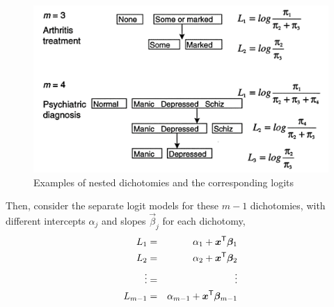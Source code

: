 \documentclass[11pt]{book}\usepackage[]{graphicx}\usepackage[]{color}
\begin{document}
\begin{figure}[htb]
  \centering
  \includegraphics[width=.8\textwidth]{ch07/fig/nested1c}
  \caption[Nested dichotomies]{Examples of nested dichotomies and the corresponding logits}\label{fig:nested1}
\end{figure}

Then, consider the separate logit models for these $m-1$ dichotomies, with different
intercepts $\alpha_j$ and slopes $\vec{\beta}_j$ for each dichotomy,
\begin{eqnarray*}
  L_1 & = & \alpha_1 + \bm{x} ^\mathsf{T} \bm{\beta}_1 \\
  L_2 & = & \alpha_2 + \bm{x} ^\mathsf{T} \bm{\beta}_2 \\
  \vdots & = & \vdots \\
  L_{m-1} & = & \alpha_{m-1} + \bm{x} ^\mathsf{T} \bm{\beta}_{m-1} \\  
\end{eqnarray*}
\end{document}
